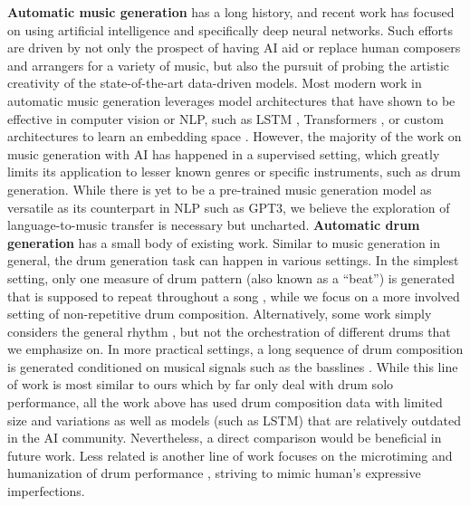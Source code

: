 \documentclass[letterpaper]{article} %
\begin{document}
\textbf{Automatic music generation} has a long history, and recent work has focused on using artificial intelligence \cite{kaliakatsos2020artificial} and specifically deep neural networks. Such efforts are driven by not only the prospect of having AI aid or replace human composers and arrangers for a variety of music, but also the pursuit of probing the artistic creativity of the state-of-the-art data-driven models. Most modern work in automatic music generation leverages model architectures that have shown to be effective in computer vision or NLP, such as LSTM \cite{lyu2015modelling}, Transformers \citep{huang2018music,zeng2021musicbert,https://doi.org/10.48550/arxiv.2210.10349}, or custom architectures to learn an embedding space \cite{liang2020pirhdy}. However, the majority of the work on music generation with AI has happened in a supervised setting, which greatly limits its application to lesser known genres or specific instruments, such as drum generation. While there is yet to be a pre-trained music generation model as versatile as its counterpart in NLP such as GPT3, we believe the exploration of language-to-music transfer is necessary but uncharted.  \textbf{Automatic drum generation} has a small body of existing work. Similar to music generation in general, the drum generation task can happen in various settings. In the simplest setting, only one measure of drum pattern (also known as a ``beat'') is generated that is supposed to repeat throughout a song  \cite{vogl2017intelligent,bruford2020jaki,complexis21}, while we focus on a more involved setting of non-repetitive drum composition. Alternatively, some work simply considers the general rhythm \cite{lattner2019high}, but not the orchestration of different drums that we emphasize on. In more practical settings, a long sequence of drum composition is generated conditioned on musical signals such as the basslines \cite{makris2017combining,makris2019conditional}. While this line of work is most similar to ours which by far only deal with drum solo performance, all the work above has used drum composition data with limited size and variations as well as models (such as LSTM) that are relatively outdated in the AI community. Nevertheless, a direct comparison would be beneficial in future work. Less related is another line of work focuses on the microtiming and humanization of drum performance \cite{gillick2019learning,burloiu2020adaptive,burloiu2020interactive}, striving to mimic human's expressive imperfections.
\end{document}
